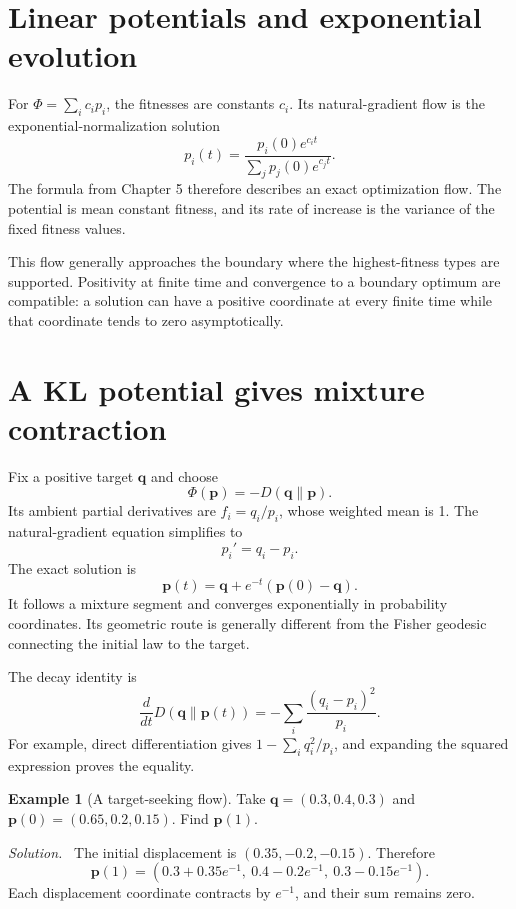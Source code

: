 \documentclass[11pt,oneside,openany]{book}
\theoremstyle{definition}
\newtheorem{example}{Example}[chapter]
\theoremstyle{remark}
\newenvironment{solution}{\par\smallskip\noindent\textit{Solution.}\ }{\par\smallskip}
\newcommand{\p}{\mathbf{p}}
\newcommand{\q}{\mathbf{q}}
\numberwithin{equation}{chapter}
\begin{document}
\section{Linear potentials and exponential evolution}
For $\Phi=\sum_i c_ip_i$, the fitnesses are constants $c_i$. Its natural-gradient flow is the exponential-normalization solution
\[
p_i(t)=\frac{p_i(0)e^{c_it}}{\sum_jp_j(0)e^{c_jt}}.
\]
The formula from Chapter 5 therefore describes an exact optimization flow. The potential is mean constant fitness, and its rate of increase is the variance of the fixed fitness values.

This flow generally approaches the boundary where the highest-fitness types are supported. Positivity at finite time and convergence to a boundary optimum are compatible: a solution can have a positive coordinate at every finite time while that coordinate tends to zero asymptotically.

\section{A KL potential gives mixture contraction}
Fix a positive target $\q$ and choose
\[
\Phi(\p)=-D(\q\|\p).
\]
Its ambient partial derivatives are $f_i=q_i/p_i$, whose weighted mean is 1. The natural-gradient equation simplifies to
\begin{equation}\label{eq:klgradient}
\boxed{p_i'=q_i-p_i.}
\end{equation}
The exact solution is
\begin{equation}\label{eq:klcontraction}
\p(t)=\q+e^{-t}(\p(0)-\q).
\end{equation}
It follows a mixture segment and converges exponentially in probability coordinates. Its geometric route is generally different from the Fisher geodesic connecting the initial law to the target.

The decay identity is
\begin{equation}\label{eq:klgradientdecay}
\frac{d}{dt}D(\q\|\p(t))=-\sum_i\frac{(q_i-p_i)^2}{p_i}.
\end{equation}
For example, direct differentiation gives $1-\sum_iq_i^2/p_i$, and expanding the squared expression proves the equality.

\begin{example}[A target-seeking flow]
Take $\q=(0.3,0.4,0.3)$ and $\p(0)=(0.65,0.2,0.15)$. Find $\p(1)$.
\begin{solution}
The initial displacement is $(0.35,-0.2,-0.15)$. Therefore
\[
\p(1)=(0.3+0.35e^{-1},\ 0.4-0.2e^{-1},\ 0.3-0.15e^{-1}).
\]
Each displacement coordinate contracts by $e^{-1}$, and their sum remains zero.
\end{solution}
\end{example}
\end{document}
